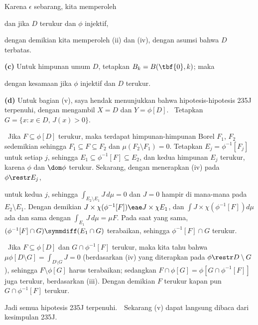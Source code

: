 {Karena $\epsilon$ sebarang, kita memperoleh


\noindent dan jika $D$ terukur dan $\phi$ injektif,


\noindent dengan demikian kita memperoleh (ii) dan (iv), dengan asumsi bahwa $D$
terbatas.

\medskip

{\bf (c)} Untuk himpunan umum $D$, tetapkan $B_k=B(\tbf{0},k)$;  maka


\noindent dengan kesamaan jika $\phi$ injektif dan $D$ terukur.

\medskip

{\bf (d)} Untuk bagian (v), saya hendak menunjukkan bahwa
hipotesis-hipotesis 235J terpenuhi, dengan mengambil $X=D$ dan $Y=\phi[D]$.   \Prf\
Tetapkan $G=\{x:x\in D,\,J(x)>0\}$.

\medskip

\quad\grheada\ Jika $F\subseteq\phi[D]$ terukur, maka terdapat
himpunan-himpunan Borel $F_1$, $F_2$ sedemikian sehingga
$F_1\subseteq F\subseteq F_2$ dan $\mu(F_2\setminus F_1)=0$.   Tetapkan
$E_j=\phi^{-1}[F_j]$ untuk setiap $j$, sehingga
$E_1\subseteq \phi^{-1}[F]\subseteq E_2$, dan kedua himpunan $E_j$
terukur,
karena $\phi$ dan $\dom\phi$ terukur.   Sekarang, dengan menerapkan (iv) pada
$\phi\restr E_j$,


\noindent untuk kedua $j$, sehingga $\int_{E_2\setminus E_1}J\,d\mu=0$ dan $J=0$
hampir di mana-mana pada $E_2\setminus E_1$.   Dengan demikian
$J\times\chi(\phi^{-1}[F])\eae J\times\chi E_1$, dan
$\int J\times\chi(\phi^{-1}[F])d\mu$ ada dan sama dengan
$\int_{E_1}J\,d\mu=\mu F$.   Pada saat yang sama,
$(\phi^{-1}[F]\cap G)\symmdiff(E_1\cap G)$ terabaikan, sehingga
$\phi^{-1}[F]\cap G$ terukur.

\medskip

\quad\grheadb\ Jika $F\subseteq\phi[D]$ dan $G\cap\phi^{-1}[F]$
terukur, maka kita tahu bahwa $\mu\phi[D\setminus G]=\int_{D\setminus
G}J=0$ (berdasarkan (iv) yang diterapkan pada $\phi\restr D\setminus G$),
sehingga $F\setminus\phi[G]$ harus terabaikan;  sedangkan
$F\cap\phi[G]=\phi[G\cap\phi^{-1}[F]]$ juga terukur, berdasarkan (iii).
Dengan demikian $F$ terukur kapan pun $G\cap\phi^{-1}[F]$
terukur.

\medskip

Jadi semua hipotesis 235J terpenuhi.\ \QeD\   Sekarang (v) dapat
langsung dibaca dari kesimpulan 235J.
}%

